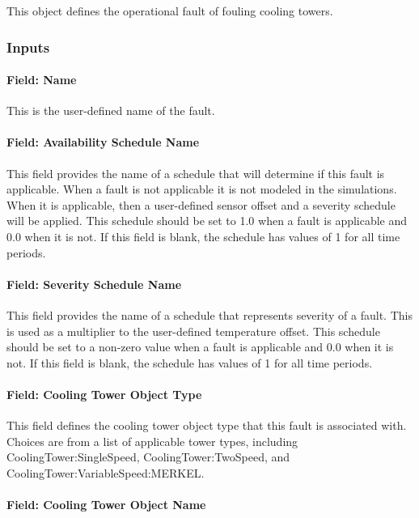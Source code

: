 This object defines the operational fault of fouling cooling towers.

\subsubsection{Inputs}

\paragraph{Field: Name}

This is the user-defined name of the fault.

\paragraph{Field: Availability Schedule Name}

This field provides the name of a schedule that will determine if this fault is applicable. When a fault is not applicable it is not modeled in the simulations. When it is applicable, then a user-defined sensor offset and a severity schedule will be applied. This schedule should be set to 1.0 when a fault is applicable and 0.0 when it is not. If this field is blank, the schedule has values of 1 for all time periods.

\paragraph{Field: Severity Schedule Name}\label{field-severity-schedule-name}

This field provides the name of a schedule that represents severity of a fault. This is used as a multiplier to the user-defined temperature offset. This schedule should be set to a non-zero value when a fault is applicable and 0.0 when it is not. If this field is blank, the schedule has values of 1 for all time periods.

\paragraph{Field: Cooling Tower Object Type}\label{field-tower-object-type}

This field defines the cooling tower object type that this fault is associated with. Choices are from a list of applicable tower types, including CoolingTower:SingleSpeed, CoolingTower:TwoSpeed, and CoolingTower:VariableSpeed:MERKEL.

\paragraph{Field: Cooling Tower Object Name}\label{field-tower-object-name}

